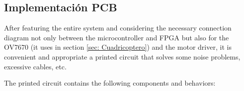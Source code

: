 

\subsection{Implementación PCB}\label{sec:PCB}

After featuring the entire system and considering the necessary connection diagram not only between the microcontroller and FPGA but also for the OV7670 (it uses in section \ref{sec: Cuadricoptero}) and the motor driver, it is convenient and appropriate a printed circuit that solves some noise problems, excessive cables, etc. \newline

The printed circuit contains the following components and behaviors:

